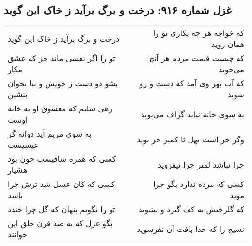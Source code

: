 \begin{center}
\section*{غزل شماره ۹۱۶: درخت و برگ برآید ز خاک این گوید}
\label{sec:0916}
\begin{longtable}{l p{0.5cm} r}
درخت و برگ برآید ز خاک این گوید
&&
که خواجه هر چه بکاری تو را همان روید
\\
تو را اگر نفسی ماند جز که عشق مکار
&&
که چیست قیمت مردم هر آنچ می‌جوید
\\
بشو دو دست ز خویش و بیا بخوان بنشین
&&
که آب بهر وی آمد که دست و رو شوید
\\
زهی سلیم که معشوق او به خانه اوست
&&
به سوی خانه نیاید گزاف می‌پوید
\\
به سوی مریم آید دوانه گر عیسیست
&&
وگر خر است بهل تا کمیز خر بوید
\\
کسی که همره ساقیست چون بود هشیار
&&
چرا نباشد لمتر چرا نیفزوید
\\
کسی که کان عسل شد ترش چرا باشد
&&
کسی که مرده ندارد بگو چرا موید
\\
تو را بگویم پنهان که گل چرا خندد
&&
که گلرخیش به کف گیرد و بینبوید
\\
بگو غزل که به صد قرن خلق این خوانند
&&
نسیج را که خدا بافت آن نفرسوید
\\
\end{longtable}
\end{center}
